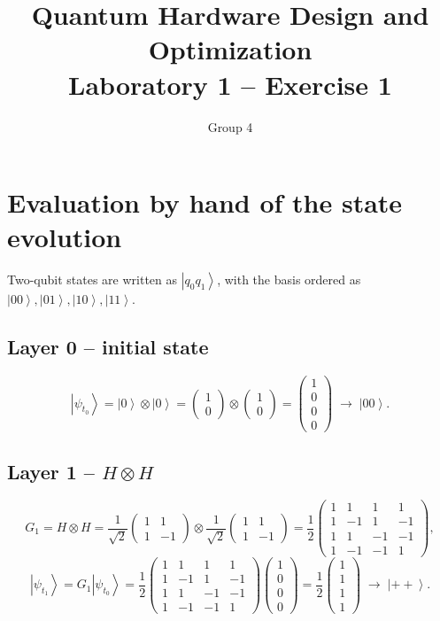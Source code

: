 \documentclass[11pt,a4paper]{article}
\title{Quantum Hardware Design and Optimization\\ Laboratory 1 -- Exercise 1}
\author{Group 4}
\date{}
\newcommand{\ket}[1]{\left|#1\right\rangle}
\newcommand{\psit}[1]{\ket{\psi_{t_{#1}}}}
\newcommand{\HH}{\begin{pmatrix} 1 & 1 & 1 & 1\\ 1 & -1 & 1 & -1\\ 1 & 1 & -1 & -1\\ 1 & -1 & -1 & 1 \end{pmatrix}}
\begin{document}
\maketitle

\section*{Evaluation by hand of the state evolution}

Two-qubit states are written as $\ket{q_0 q_1}$, with the basis ordered as
$\ket{00},\ket{01},\ket{10},\ket{11}$.

\subsection*{Layer 0 -- initial state}
\[
\psit{0} = \ket{0}\otimes\ket{0} =
\begin{pmatrix}1\\0\end{pmatrix}\otimes\begin{pmatrix}1\\0\end{pmatrix} =
\begin{pmatrix}1\\0\\0\\0\end{pmatrix} \;\rightarrow\; \ket{00}.
\]

\subsection*{Layer 1 -- $H\otimes H$}
\[
G_1 = H\otimes H =
\frac{1}{\sqrt2}\begin{pmatrix}1&1\\1&-1\end{pmatrix}\otimes
\frac{1}{\sqrt2}\begin{pmatrix}1&1\\1&-1\end{pmatrix} = \frac12\HH,
\]
\[
\psit{1} = G_1\psit{0} = \frac12\HH\begin{pmatrix}1\\0\\0\\0\end{pmatrix}
= \frac12\begin{pmatrix}1\\1\\1\\1\end{pmatrix} \;\rightarrow\; \ket{++}.
\]
\end{document}
